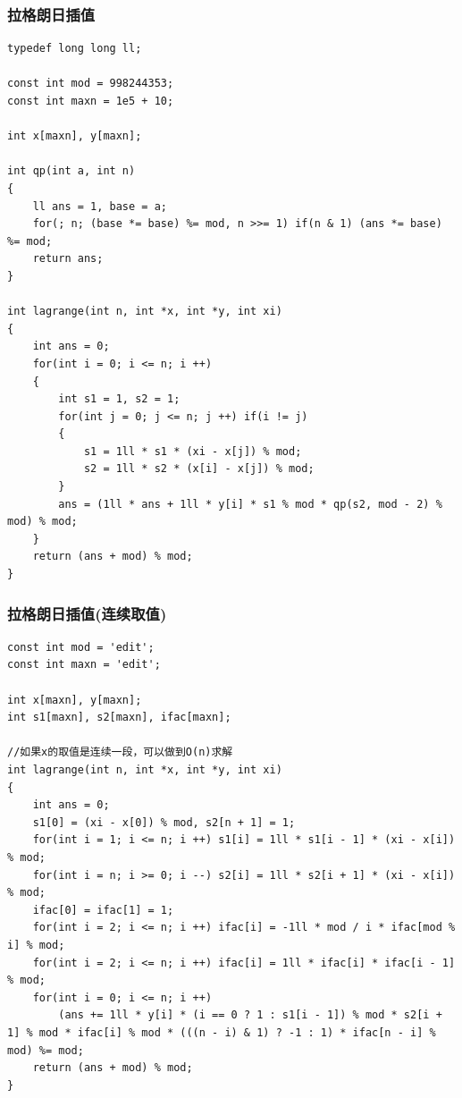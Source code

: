 \documentclass[twoside]{article}
\begin{document}
\subsubsection{拉格朗日插值}
\begin{lstlisting}
typedef long long ll;

const int mod = 998244353;
const int maxn = 1e5 + 10;

int x[maxn], y[maxn];

int qp(int a, int n)
{
	ll ans = 1, base = a;
	for(; n; (base *= base) %= mod, n >>= 1) if(n & 1) (ans *= base) %= mod;
	return ans;
}

int lagrange(int n, int *x, int *y, int xi)
{
	int ans = 0;
	for(int i = 0; i <= n; i ++)
	{
		int s1 = 1, s2 = 1;
		for(int j = 0; j <= n; j ++) if(i != j)
		{
			s1 = 1ll * s1 * (xi - x[j]) % mod;
			s2 = 1ll * s2 * (x[i] - x[j]) % mod;
		}
		ans = (1ll * ans + 1ll * y[i] * s1 % mod * qp(s2, mod - 2) % mod) % mod;
	}
	return (ans + mod) % mod;
}
\end{lstlisting}
\subsubsection{拉格朗日插值(连续取值)}
\begin{lstlisting}
const int mod = 'edit';
const int maxn = 'edit';

int x[maxn], y[maxn];
int s1[maxn], s2[maxn], ifac[maxn];

//如果x的取值是连续一段，可以做到O(n)求解
int lagrange(int n, int *x, int *y, int xi)
{
	int ans = 0;
	s1[0] = (xi - x[0]) % mod, s2[n + 1] = 1;
	for(int i = 1; i <= n; i ++) s1[i] = 1ll * s1[i - 1] * (xi - x[i]) % mod;
	for(int i = n; i >= 0; i --) s2[i] = 1ll * s2[i + 1] * (xi - x[i]) % mod;
	ifac[0] = ifac[1] = 1;
	for(int i = 2; i <= n; i ++) ifac[i] = -1ll * mod / i * ifac[mod % i] % mod;
	for(int i = 2; i <= n; i ++) ifac[i] = 1ll * ifac[i] * ifac[i - 1] % mod;
	for(int i = 0; i <= n; i ++)
		(ans += 1ll * y[i] * (i == 0 ? 1 : s1[i - 1]) % mod * s2[i + 1] % mod * ifac[i] % mod * (((n - i) & 1) ? -1 : 1) * ifac[n - i] % mod) %= mod;
	return (ans + mod) % mod;
}\end{lstlisting}
\end{document}
